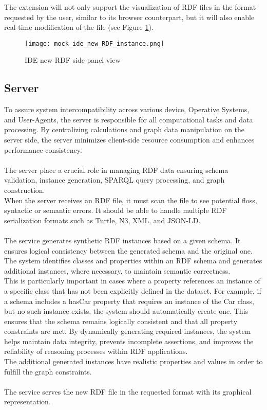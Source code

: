   The extension will not only support the visualization of RDF files in the format requested by the user, similar to its browser counterpart, but it will also enable real-time modification of the file (see Figure \ref{fig:IDERDFReader}).

  \begin{figure}[htb]
      \centering
      \texttt{[image: mock\_ide\_new\_RDF\_instance.png]}\\
      \caption{IDE new RDF side panel view}\label{fig:IDERDFReader}
    \end{figure}

  \subsection{Server\label{sec:server}}
  To assure system intercompatibility across various device, Operative Systems, and User-Agents, the server is responsible for all computational tasks and data processing. By centralizing calculations and graph data manipulation on the server side, the server minimizes client-side resource consumption and enhances performance consistency. 
  \\
  \\
  The server place a crucial role in managing RDF data ensuring  schema validation, instance generation, SPARQL query processing, and graph construction.
  \\
  When the server receives an RDF file, it must scan the file to see potential floss, syntactic or semantic errors. It should be able to handle multiple RDF serialization formats such as Turtle, N3, XML, and JSON-LD. 
  \\
  \\
  The service generates synthetic RDF instances based on a given schema. It ensures logical consistency between the generated schema and the original one.
  \\
  The system identifies classes and properties within an RDF schema and generates additional instances, where necessary, to maintain semantic correctness. 
  \\
  This is particularly important in cases where a property references an instance of a specific class that has not been explicitly defined in the dataset.
  For example, if a schema includes a hasCar property that requires an instance of the Car class, but no such instance exists, the system should automatically create one. This ensures that the schema remains logically consistent and that all property constraints are met. By dynamically generating required instances, the system helps maintain data integrity, prevents incomplete assertions, and improves the reliability of reasoning processes within RDF applications.
  \\ 
  The additional generated instances have realistic properties and values in order to fulfill the graph constraints.
  \\
  \\
  The service serves the new RDF file in the requested format with its graphical representation.